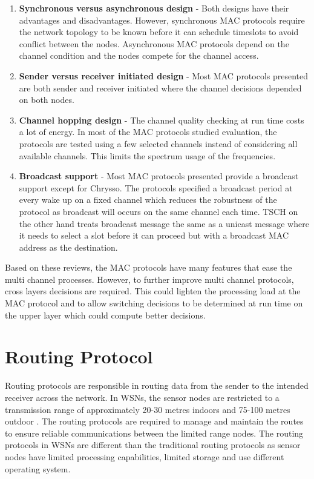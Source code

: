 \begin{enumerate}
\item \textbf{Synchronous versus asynchronous design} - 
Both designs have their advantages and disadvantages. However, synchronous MAC protocols require the network topology to be known before it can schedule timeslots to avoid conflict between the nodes. Asynchronous MAC protocols depend on the channel condition and the nodes compete for the channel access.

\item \textbf{Sender versus receiver initiated design} - 
Most MAC protocols presented are both sender and receiver initiated where the channel decisions depended on both nodes.

\item \textbf{Channel hopping design} - 
The channel quality checking at run time costs a lot of energy. In most of the MAC protocols studied evaluation, the protocols are tested using a few selected channels instead of considering all available channels. This limits the spectrum usage of the frequencies.

\item \textbf{Broadcast support} - 
Most MAC protocols presented provide a broadcast support except for Chrysso. The protocols specified a broadcast period at every wake up on a fixed channel which reduces the robustness of the protocol as broadcast will occurs on the same channel each time. TSCH on the other hand treats broadcast message the same as a unicast message where it needs to select a slot before it can proceed but with a broadcast MAC address as the destination.
\end{enumerate}

Based on these reviews, the MAC protocols have many features that ease the multi channel processes. However, to further improve multi channel protocols, cross layers decisions are required. This could lighten the processing load at the MAC protocol and to allow switching decisions to be determined at run time on the upper layer which could compute better decisions.

\section{Routing Protocol}
\label{routingProtocols}
Routing protocols are responsible in routing data from the sender to the intended receiver across the network. In WSNs, the sensor nodes are restricted to a transmission range of approximately 20-30 metres indoors and 75-100 metres outdoor \cite{telosb-datasheet}. The routing protocols are required to manage and maintain the routes to ensure reliable communications between the limited range nodes. The routing protocols in WSNs are different than the traditional routing protocols as sensor nodes have limited processing capabilities, limited storage and use different operating system.


